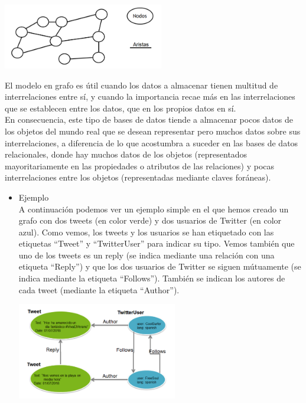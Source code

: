 \documentclass[twoside,twocolumn]{article}
\begin{document}
\begin{center}
	\includegraphics[width=7cm]{./Imagenes/nodos_aristas} 
\end{center}

El modelo en grafo es útil cuando los datos a almacenar tienen multitud de interrelaciones entre sí, y cuando la importancia recae más en las interrelaciones que se establecen entre los datos, que en los propios datos en sí. 
\\
En consecuencia, este tipo de bases de datos tiende a almacenar pocos datos de los objetos del mundo real que se desean representar pero muchos datos sobre sus interrelaciones, a diferencia de lo que acostumbra a suceder en las bases de datos relacionales, donde hay muchos datos de los objetos (representados mayoritariamente en las propiedades o atributos de las relaciones) y pocas interrelaciones entre los objetos (representadas mediante claves foráneas). 


\begin{itemize}
\item Ejemplo
\\ A continuación podemos ver un ejemplo simple en el que hemos creado un grafo con dos tweets (en color verde) y dos usuarios de Twitter (en color azul). Como vemos, los tweets y los usuarios se han etiquetado con las etiquetas “Tweet” y “TwitterUser” para indicar su tipo. Vemos también que uno de los tweets es un reply (se indica mediante una relación con una etiqueta “Reply”) y que los dos usuarios de Twitter se siguen mútuamente (se indica mediante la etiqueta “Follows”). También se indican los autores de cada tweet (mediante la etiqueta “Author”).


\begin{center}
	\includegraphics[width=7cm]{./Imagenes/tweet} 
\end{center}

\end{itemize} 
\end{document}
